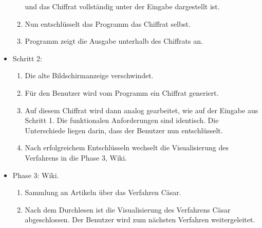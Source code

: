 \documentclass{article}
\begin{document}
\begin{itemize}[label={}]
\begin{enumerate}
und das Chiffrat vollständig unter der Eingabe dargestellt ist.
  \item Nun entschlüsselt das Programm das Chiffrat selbst.
  \item Programm zeigt die Ausgabe unterhalb des Chiffrats an.
 \end{enumerate}
 \item Schritt 2:
 \begin{enumerate}
  \item Die alte Bildschirmanzeige verschwindet.
  \item Für den Benutzer wird vom Programm ein Chiffrat generiert. 
  \item[] Auf diesem Chiffrat wird dann analog gearbeitet, wie auf der Eingabe aus Schritt 1. Die funktionalen 
Anforderungen sind identisch. Die Unterschiede liegen darin, dass der Benutzer nun entschlüsselt.
  \item Nach erfolgreichem Entschlüsseln wechselt die Visualisierung des Verfahrens in die Phase 3, Wiki.
 \end{enumerate}
 \item Phase 3: Wiki.
  \begin{enumerate}
   \item Sammlung an Artikeln über das Verfahren Cäsar.
   \item Nach dem Durchlesen ist die Visualisierung des Verfahrens Cäsar abgeschlossen. Der Benutzer wird zum 
nächsten Verfahren weitergeleitet.
  \end{enumerate}
\end{itemize}
\end{document}
